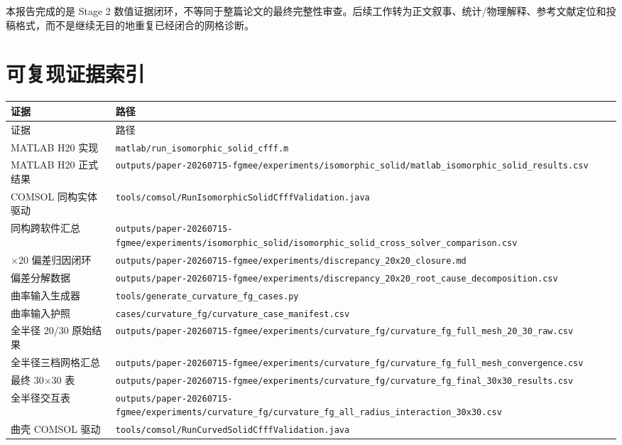 \documentclass[UTF8,fontset=windows,11pt,a4paper]{ctexart}
\begin{document}
本报告完成的是 Stage 2 数值证据闭环，不等同于整篇论文的最终完整性审查。后续工作转为正文叙事、统计/物理解释、参考文献定位和投稿格式，而不是继续无目的地重复已经闭合的网格诊断。

\section{可复现证据索引}

\begin{longtable}{>{\raggedright\arraybackslash}p{}>{\raggedright\arraybackslash}p{}}
\toprule
证据 & 路径 \\
\midrule
\endfirsthead
\toprule
证据 & 路径 \\
\midrule
\endhead
MATLAB H20 实现 & \nolinkurl{matlab/run_isomorphic_solid_cfff.m} \\
MATLAB H20 正式结果 & \nolinkurl{outputs/paper-20260715-fgmee/experiments/isomorphic_solid/matlab_isomorphic_solid_results.csv} \\
COMSOL 同构实体驱动 & \nolinkurl{tools/comsol/RunIsomorphicSolidCfffValidation.java} \\
同构跨软件汇总 & \nolinkurl{outputs/paper-20260715-fgmee/experiments/isomorphic_solid/isomorphic_solid_cross_solver_comparison.csv} \\
20$\times$20 偏差归因闭环 & \nolinkurl{outputs/paper-20260715-fgmee/experiments/discrepancy_20x20_closure.md} \\
偏差分解数据 & \nolinkurl{outputs/paper-20260715-fgmee/experiments/discrepancy_20x20_root_cause_decomposition.csv} \\
曲率输入生成器 & \nolinkurl{tools/generate_curvature_fg_cases.py} \\
曲率输入护照 & \nolinkurl{cases/curvature_fg/curvature_case_manifest.csv} \\
全半径 20/30 原始结果 & \nolinkurl{outputs/paper-20260715-fgmee/experiments/curvature_fg/curvature_fg_full_mesh_20_30_raw.csv} \\
全半径三档网格汇总 & \nolinkurl{outputs/paper-20260715-fgmee/experiments/curvature_fg/curvature_fg_full_mesh_convergence.csv} \\
最终 30$\times$30 表 & \nolinkurl{outputs/paper-20260715-fgmee/experiments/curvature_fg/curvature_fg_final_30x30_results.csv} \\
全半径交互表 & \nolinkurl{outputs/paper-20260715-fgmee/experiments/curvature_fg/curvature_fg_all_radius_interaction_30x30.csv} \\
曲壳 COMSOL 驱动 & \nolinkurl{tools/comsol/RunCurvedSolidCfffValidation.java} \\

\end{longtable}
\end{document}
